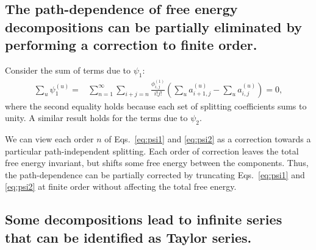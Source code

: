 \documentclass{article}
\begin{document}
\subsection{The path-dependence of free energy decompositions can be partially eliminated by performing a correction to finite order.}

Consider the sum of terms due to $\psi_1$:
\begin{align*}
\sum_u \psi_1^{(u)} =&
	\sum_{n=1}^{\infty}
    \sum_{i+j=n}
        \frac{\phi_{i,j}^{(1)}}{i!j!}
        \left(
        		\sum_u a_{i+1,j}^{(u)} -
        		\sum_u a_{i,j}^{(u)}
        \right) = 0,
\end{align*}
where the second equality holds because each set of splitting coefficients sums to unity. A similar result holds for the terms due to $\psi_2$.

We can view each order $n$ of Eqs.~\ref{eq:psi1} and \ref{eq:psi2} as a correction towards a particular path-independent splitting. Each order of correction leaves the total free energy invariant, but shifts some free energy between the components. Thus, the path-dependence can be partially corrected by truncating Eqs.~\ref{eq:psi1} and \ref{eq:psi2} at finite order without affecting the total free energy.








\subsection{Some decompositions lead to infinite series that can be identified as Taylor series.}
\end{document}
